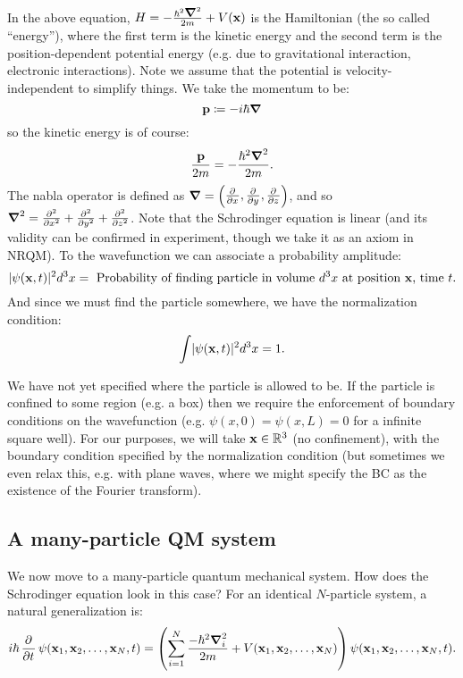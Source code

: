 In the above equation, $H = -\frac{\hbar^2 \nabla^2}{2m} + V(\v{x})$ is the Hamiltonian (the so called ``energy''), where the first term is the kinetic energy and the second term is the position-dependent potential energy (e.g. due to gravitational interaction, electronic interactions). Note we assume that the potential is velocity-independent to simplify things. We take the momentum to be:
\begin{equation}
    \v{p} \coloneqq -i\hbar\nabla
\end{equation}
so the kinetic energy is of course:
\begin{equation}
    \frac{\v{p}}{2m} = -\frac{\hbar^2\nabla^2}{2m}.
\end{equation}
The nabla operator is defined as $\nabla = \m{\pd{}{x}, \pd{}{y},\pd{}{z}}$, and so $\nabla^2 = \pd[2]{}{x} + \pd[2]{}{y} + \pd[2]{}{z}$. Note that the Schrodinger equation is linear (and its validity can be confirmed in experiment, though we take it as an axiom in NRQM). To the wavefunction we can associate a probability amplitude:
\begin{equation}
    \lvert \psi(\mathbf{x}, t) \rvert^2d^3x = \text{ Probability of finding particle in volume $d^3x$ at position $\mathbf{x}$, time $t$.}
\end{equation}
And since we must find the particle somewhere, we have the normalization condition:
\begin{equation}
    \int \lvert \psi(\mathbf{x}, t) \rvert^2 d^3x = 1.
\end{equation}

We have not yet specified where the particle is allowed to be. If the particle is confined to some region (e.g. a box) then we require the enforcement of boundary conditions on the wavefunction (e.g. $\psi(x, 0) = \psi(x, L) = 0$ for a infinite square well). For our purposes, we will take $\mathbf{x} \in \mathbb{R}^3$ (no confinement), with the boundary condition specified by the normalization condition (but sometimes we even relax this, e.g. with plane waves, where we might specify the BC as the existence of the Fourier transform). 

\subsection{A many-particle QM system}
We now move to a many-particle quantum mechanical system. How does the Schrodinger equation look in this case? For an identical $N$-particle system, a natural generalization is:
\begin{equation}\label{eq-SEinteracting}
    i\hbar\dpd{}{t}\psi(\v{x}_1, \v{x}_2, \ldots, \v{x}_N, t) = \left(\sum_{i=1}^N\frac{-\hbar^2\nabla_i^2}{2m} + V(\v{x}_1, \v{x}_2, \ldots, \v{x}_N)\right)\psi(\v{x}_1, \v{x}_2, \ldots, \v{x}_N, t).
\end{equation}

